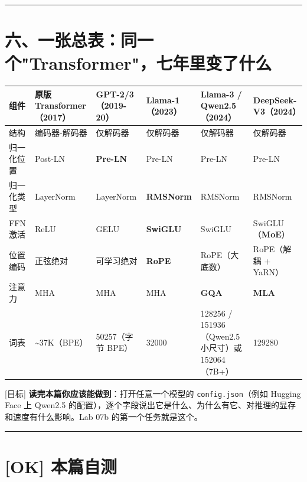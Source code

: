 \vspace{0.8em}\hrule\vspace{0.8em}

\section{六、一张总表：同一个"Transformer"，七年里变了什么}

\begin{center}
\small
\begin{tabularx}{\textwidth}{l X X X X X }
\toprule
\textbf{组件} & \textbf{原版 Transformer（2017）} & \textbf{GPT-2/3（2019-20）} & \textbf{Llama-1（2023）} & \textbf{Llama-3 / Qwen2.5（2024）} & \textbf{DeepSeek-V3（2024）} \\
\midrule
结构 & 编码器-解码器 & 仅解码器 & 仅解码器 & 仅解码器 & 仅解码器 \\
归一化位置 & Post-LN & \textbf{Pre-LN} & Pre-LN & Pre-LN & Pre-LN \\
归一化类型 & LayerNorm & LayerNorm & \textbf{RMSNorm} & RMSNorm & RMSNorm \\
FFN 激活 & ReLU & GELU & \textbf{SwiGLU} & SwiGLU & SwiGLU（\textbf{MoE}） \\
位置编码 & 正弦绝对 & 可学习绝对 & \textbf{RoPE} & RoPE（大底数） & RoPE（解耦 + YaRN） \\
注意力 & MHA & MHA & MHA & \textbf{GQA} & \textbf{MLA} \\
词表 & \textasciitilde{}37K（BPE） & 50257（字节 BPE） & 32000 & 128256 / 151936（Qwen2.5 小尺寸）或 152064（7B+） & 129280 \\
\bottomrule
\end{tabularx}
\end{center}

\begin{noteBox}[核心导读与背景]
{}[目标] \textbf{读完本篇你应该能做到}：打开任意一个模型的 \texttt{config.json}（例如 Hugging Face 上 Qwen2.5 的配置），逐个字段说出它是什么、为什么有它、对推理的显存和速度有什么影响。Lab 07b 的第一个任务就是这个。
\end{noteBox}

\vspace{0.8em}\hrule\vspace{0.8em}

\section{[OK] 本篇自测}

